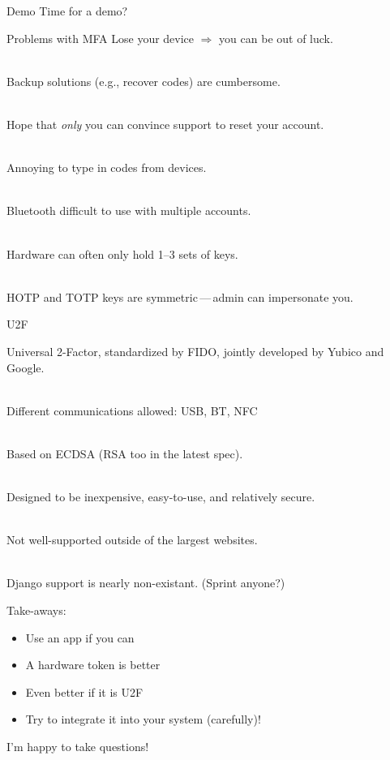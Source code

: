 \documentclass{beamer}
\begin{document}
\begin{frame}{Demo}
Time for a demo?
\end{frame}

\begin{frame}{Problems with MFA}
Lose your device $\Rightarrow$ you can be out of luck.

\ \\

Backup solutions (e.g., recover codes) are cumbersome.

\ \\

Hope that \emph{only} you can convince support to reset your account.

\ \\

Annoying to type in codes from devices.

\ \\

Bluetooth difficult to use with multiple accounts.

\ \\

Hardware can often only hold 1--3 sets of keys.

\ \\

HOTP and TOTP keys are symmetric\,---\,admin can impersonate you.


\end{frame}

\begin{frame}{U2F}

Universal 2-Factor, standardized by FIDO, jointly developed by Yubico and Google.

\ \\

Different communications allowed: USB, BT, NFC

\ \\

Based on ECDSA (RSA too in the latest spec).

\ \\

Designed to be inexpensive, easy-to-use, and relatively secure.

\ \\

Not well-supported outside of the largest websites.

\ \\

Django support is nearly non-existant. (Sprint anyone?)

\end{frame}

\begin{frame}

Take-aways:

\begin{itemize}
  \item Use an app if you can
  \item A hardware token is better
  \item Even better if it is U2F
  \item Try to integrate it into your system (carefully)!
\end{itemize}

I'm happy to take questions!

\end{frame}
\end{document}
